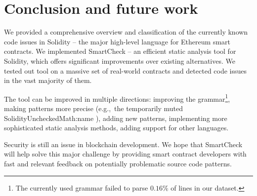 \section{Conclusion and future work}
	
We provided a comprehensive overview and classification of the currently known code issues in Solidity -- the major high-level language for Ethereum smart contracts.
We implemented SmartCheck -- an efficient static analysis tool for Solidity, which offers significant improvements over existing alternatives.
We tested out tool on a massive set of real-world contracts and detected code issues in the vast majority of them.

The tool can be improved in multiple directions: improving the grammar\footnote{The currently used grammar failed to parse $0.16$\% of lines in our dataset.}, making patterns more precise (e.g.,~the temporarily muted {\usevalue SolidityUncheckedMath:name }), adding new patterns, implementing more sophisticated static analysis methods, adding support for other languages.

Security is still an issue in blockchain development.
We hope that SmartCheck will help solve this major challenge by providing smart contract developers with fast and relevant feedback on potentially problematic source code patterns.